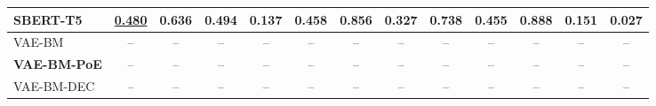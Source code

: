 \begin{table}[t]
{\begin{tabular}{lcccccccccccc}
SBERT-T5 & \underline{0.480} & 0.636 & 0.494 & 0.137 & 0.458 & 0.856 & 0.327 & 0.738 & 0.455 & 0.888 & 0.151 & 0.027 \\
\midrule
VAE-BM & -- & -- & -- & -- & -- & -- & -- & -- & -- & -- & -- & -- \\
\textbf{VAE-BM-PoE} & -- & -- & -- & -- & -- & -- & -- & -- & -- & -- & -- & -- \\
VAE-BM-DEC & -- & -- & -- & -- & -- & -- & -- & -- & -- & -- & -- & -- \\
\bottomrule
\end{tabular}
}
\end{table}
